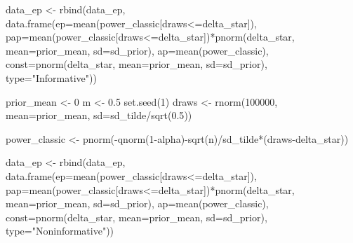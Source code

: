 \documentclass[
]{book}
\newenvironment{Shaded}{\begin{snugshade}}{\end{snugshade}}
\newcommand{\AttributeTok}[1]{\textcolor[rgb]{0.77,0.63,0.00}{#1}}
\newcommand{\DecValTok}[1]{\textcolor[rgb]{0.00,0.00,0.81}{#1}}
\newcommand{\FloatTok}[1]{\textcolor[rgb]{0.00,0.00,0.81}{#1}}
\newcommand{\FunctionTok}[1]{\textcolor[rgb]{0.00,0.00,0.00}{#1}}
\newcommand{\NormalTok}[1]{#1}
\newcommand{\OtherTok}[1]{\textcolor[rgb]{0.56,0.35,0.01}{#1}}
\newcommand{\SpecialCharTok}[1]{\textcolor[rgb]{0.00,0.00,0.00}{#1}}
\newcommand{\StringTok}[1]{\textcolor[rgb]{0.31,0.60,0.02}{#1}}
\begin{document}
\begin{Shaded}
\begin{Highlighting}[]
\NormalTok{data\_ep }\OtherTok{\textless{}{-}} \FunctionTok{rbind}\NormalTok{(data\_ep, }\FunctionTok{data.frame}\NormalTok{(}\AttributeTok{ep=}\FunctionTok{mean}\NormalTok{(power\_classic[draws}\SpecialCharTok{\textless{}=}\NormalTok{delta\_star]), }\AttributeTok{pap=}\FunctionTok{mean}\NormalTok{(power\_classic[draws}\SpecialCharTok{\textless{}=}\NormalTok{delta\_star])}\SpecialCharTok{*}\FunctionTok{pnorm}\NormalTok{(delta\_star, }\AttributeTok{mean=}\NormalTok{prior\_mean, }\AttributeTok{sd=}\NormalTok{sd\_prior), }\AttributeTok{ap=}\FunctionTok{mean}\NormalTok{(power\_classic), }\AttributeTok{const=}\FunctionTok{pnorm}\NormalTok{(delta\_star, }\AttributeTok{mean=}\NormalTok{prior\_mean, }\AttributeTok{sd=}\NormalTok{sd\_prior), }\AttributeTok{type=}\StringTok{"Informative"}\NormalTok{))}

\NormalTok{prior\_mean }\OtherTok{\textless{}{-}} \DecValTok{0}
\NormalTok{m }\OtherTok{\textless{}{-}} \FloatTok{0.5}
\FunctionTok{set.seed}\NormalTok{(}\DecValTok{1}\NormalTok{)}
\NormalTok{draws }\OtherTok{\textless{}{-}} \FunctionTok{rnorm}\NormalTok{(}\DecValTok{100000}\NormalTok{, }\AttributeTok{mean=}\NormalTok{prior\_mean, }\AttributeTok{sd=}\NormalTok{sd\_tilde}\SpecialCharTok{/}\FunctionTok{sqrt}\NormalTok{(}\FloatTok{0.5}\NormalTok{))}

\NormalTok{power\_classic }\OtherTok{\textless{}{-}} \FunctionTok{pnorm}\NormalTok{(}\SpecialCharTok{{-}}\FunctionTok{qnorm}\NormalTok{(}\DecValTok{1}\SpecialCharTok{{-}}\NormalTok{alpha)}\SpecialCharTok{{-}}\FunctionTok{sqrt}\NormalTok{(n)}\SpecialCharTok{/}\NormalTok{sd\_tilde}\SpecialCharTok{*}\NormalTok{(draws}\SpecialCharTok{{-}}\NormalTok{delta\_star))}

\NormalTok{data\_ep }\OtherTok{\textless{}{-}} \FunctionTok{rbind}\NormalTok{(data\_ep, }\FunctionTok{data.frame}\NormalTok{(}\AttributeTok{ep=}\FunctionTok{mean}\NormalTok{(power\_classic[draws}\SpecialCharTok{\textless{}=}\NormalTok{delta\_star]), }\AttributeTok{pap=}\FunctionTok{mean}\NormalTok{(power\_classic[draws}\SpecialCharTok{\textless{}=}\NormalTok{delta\_star])}\SpecialCharTok{*}\FunctionTok{pnorm}\NormalTok{(delta\_star, }\AttributeTok{mean=}\NormalTok{prior\_mean, }\AttributeTok{sd=}\NormalTok{sd\_prior), }\AttributeTok{ap=}\FunctionTok{mean}\NormalTok{(power\_classic), }\AttributeTok{const=}\FunctionTok{pnorm}\NormalTok{(delta\_star, }\AttributeTok{mean=}\NormalTok{prior\_mean, }\AttributeTok{sd=}\NormalTok{sd\_prior), }\AttributeTok{type=}\StringTok{"Noninformative"}\NormalTok{))}



\end{Highlighting}
\end{Shaded}
\end{document}
